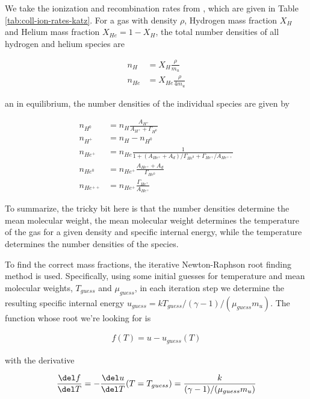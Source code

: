 We take the ionization and recombination rates from \citet{katzCosmologicalSimulationsTreeSPH1996}, 
which are given in Table \ref{tab:coll-ion-rates-katz}. For a gas with density $\rho$, Hydrogen
mass fraction $X_H$ and Helium mass fraction $X_{He} = 1 - X_H$, the total number densities of all 
hydrogen and helium species are

\begin{align}
  n_H &= X_H \frac{\rho}{m_u} \\
  n_{He} &= X_{He}  \frac{\rho}{4 m_u} 
\end{align}

an in equilibrium, the number densities of the individual species are given by

\begin{align}
    n_{H^0} &= 
        n_H \frac{A_{H^+}}{A_{H^+} + \Gamma_{H^0}} \\
    n_{H^+} &= 
        n_H - n_{H^0} \\
    n_{He^+} &= 
        n_{He} \frac{1}{1 + (A_{He^+} + A_d) / \Gamma_{He^0} + \Gamma_{He^+} / A_{He^{++}}} \\
    n_{He^0} &= 
        n_{He^+} \frac{A_{He^+} + A_d}{\Gamma_{He^0}} \\
    n_{He^{++}} &= 
        n_{He^+} \frac{\Gamma_{He^+}}{A_{He^+}}
\end{align}


To summarize, the tricky bit here is that the number densities determine the mean molecular weight, 
the mean molecular weight determines the temperature of the gas for a given density and specific 
internal energy, while the temperature determines the number densities of the species.

To find the correct mass fractions, the iterative Newton-Raphson root finding method is used. 
Specifically, using some initial guesses for temperature and mean molecular weights, $T_{guess}$ 
and $\mu_{guess}$, in each iteration step we determine the resulting specific internal energy 
$u_{guess} = k T_{guess} / (\gamma - 1) / (\mu_{guess} m_u)$. The function whose root we're looking 
for is

\begin{align}
  f(T) = u - u_{guess}(T)
\end{align}

with the derivative

\begin{align}
  \frac{\del f}{\del T} =  - \frac{\del u}{\del T} (T = T_{guess}) = \frac{k}{(\gamma - 
1) / (\mu_{guess} m_u )}
\end{align}

